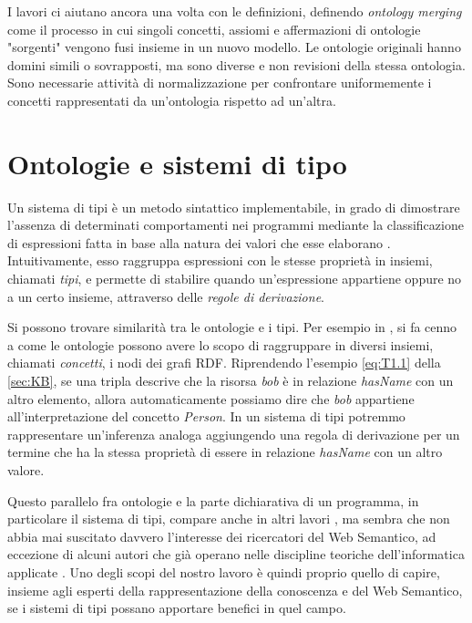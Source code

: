 I lavori \cite{choi2006Mapping, carriero2020OntoReuse} ci aiutano ancora una volta con le definizioni, definendo \textit{ontology merging} come il processo in cui singoli concetti, assiomi e affermazioni di ontologie "sorgenti" vengono fusi insieme in un nuovo modello. Le ontologie originali hanno domini simili o sovrapposti, ma sono diverse e non revisioni della stessa ontologia. Sono necessarie attività di normalizzazione per confrontare uniformemente i concetti rappresentati da un'ontologia rispetto ad un'altra.

\section{Ontologie e sistemi di tipo}
Un sistema di tipi è un metodo sintattico implementabile, in grado di dimostrare l'assenza di determinati comportamenti nei programmi mediante la classificazione di espressioni fatta in base alla natura dei valori che esse elaborano \cite{pierceTypesBook}. Intuitivamente, esso raggruppa espressioni con le stesse proprietà in insiemi, chiamati \textit{tipi}, e permette di stabilire quando un'espressione appartiene oppure no a un certo insieme, attraverso delle \textsl{regole di derivazione}.

Si possono trovare similarità tra le ontologie e i tipi. Per esempio in \cite{hitzler2021review}, si fa cenno a come le ontologie possono avere lo scopo di raggruppare in diversi insiemi, chiamati \textit{concetti}, i nodi dei grafi RDF. Riprendendo l'esempio \eqref{eq:T1.1} della \autoref{sec:KB}, se una tripla descrive che la risorsa \textsl{bob} è in relazione \textsl{hasName} con un altro elemento, allora automaticamente possiamo dire che \textsl{bob} appartiene all'interpretazione del concetto \textsl{Person}. In un sistema di tipi potremmo rappresentare  un'inferenza analoga aggiungendo una regola di derivazione per un termine che ha la stessa proprietà di essere in relazione \textsl{hasName} con un altro valore.

Questo parallelo fra ontologie e la parte dichiarativa di un programma, in particolare il sistema di tipi, compare anche in altri lavori \cite{moten2015SWTypeSystem, despeyroux2008evolution}, ma sembra che non abbia mai suscitato davvero l'interesse dei ricercatori del Web Semantico, ad eccezione di alcuni autori che già operano nelle discipline teoriche dell'informatica applicate \cite{dapoigny2011typetheoryKR, leinbergerphdthesis, ciobanu2016typeFoundationforRDFS}. Uno degli scopi del nostro lavoro è quindi proprio quello di capire, insieme agli esperti della rappresentazione della conoscenza e del Web Semantico, se i sistemi di tipi possano apportare benefici in quel campo.


